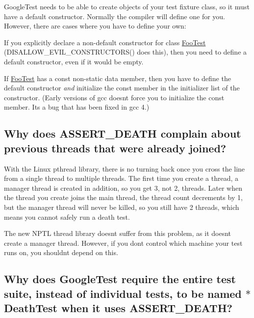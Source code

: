 Google\+Test needs to be able to create objects of your test fixture class, so it must have a default constructor. Normally the compiler will define one for you. However, there are cases where you have to define your own\+:


\begin{DoxyItemize}
\item If you explicitly declare a non-\/default constructor for class {\ttfamily \mbox{\hyperlink{classFooTest}{Foo\+Test}}} ({\ttfamily D\+I\+S\+A\+L\+L\+O\+W\+\_\+\+E\+V\+I\+L\+\_\+\+C\+O\+N\+S\+T\+R\+U\+C\+T\+O\+R\+S()} does this), then you need to define a default constructor, even if it would be empty.
\item If {\ttfamily \mbox{\hyperlink{classFooTest}{Foo\+Test}}} has a const non-\/static data member, then you have to define the default constructor {\itshape and} initialize the const member in the initializer list of the constructor. (Early versions of {\ttfamily gcc} doesn\textquotesingle{}t force you to initialize the const member. It\textquotesingle{}s a bug that has been fixed in {\ttfamily gcc 4}.)
\end{DoxyItemize}

\subsection*{Why does A\+S\+S\+E\+R\+T\+\_\+\+D\+E\+A\+TH complain about previous threads that were already joined?}

With the Linux pthread library, there is no turning back once you cross the line from a single thread to multiple threads. The first time you create a thread, a manager thread is created in addition, so you get 3, not 2, threads. Later when the thread you create joins the main thread, the thread count decrements by 1, but the manager thread will never be killed, so you still have 2 threads, which means you cannot safely run a death test.

The new N\+P\+TL thread library doesn\textquotesingle{}t suffer from this problem, as it doesn\textquotesingle{}t create a manager thread. However, if you don\textquotesingle{}t control which machine your test runs on, you shouldn\textquotesingle{}t depend on this.

\subsection*{Why does Google\+Test require the entire test suite, instead of individual tests, to be named {\ttfamily $\ast$\+Death\+Test} when it uses {\ttfamily A\+S\+S\+E\+R\+T\+\_\+\+D\+E\+A\+TH}?}

